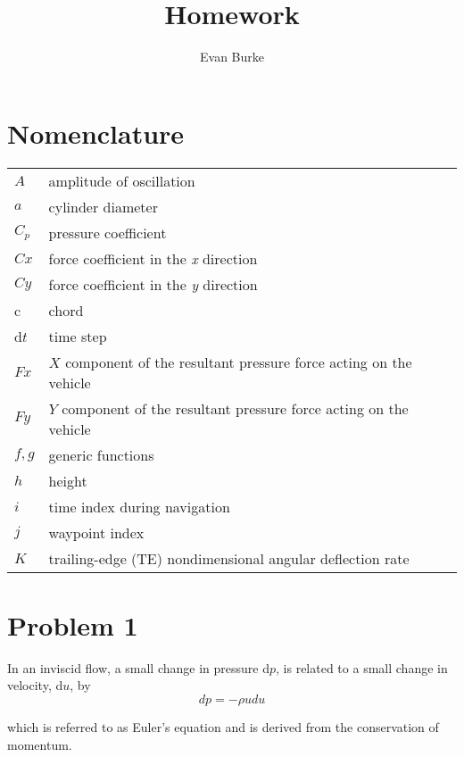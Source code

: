 \documentclass[12pt,letterpaper]{article}
\author{Evan Burke}
\title{Homework \homeworknumber}
\begin{document}
	
	
	\tableofcontents
	
	
	\newpage
	
	\section*{Nomenclature}
	
	{\renewcommand\arraystretch{1.0}
		\noindent\begin{longtable}{@{}l @{\quad=\quad} l@{}}
			$A$  & amplitude of oscillation \\
			$a$ &    cylinder diameter \\
			$C_p$& pressure coefficient \\
			$Cx$ & force coefficient in the \textit{x} direction \\
			$Cy$ & force coefficient in the \textit{y} direction \\
			c   & chord \\
			d$t$ & time step \\
			$Fx$ & $X$ component of the resultant pressure force acting on the vehicle \\
			$Fy$ & $Y$ component of the resultant pressure force acting on the vehicle \\
			$f, g$   & generic functions \\
			$h$  & height \\
			$i$  & time index during navigation \\
			$j$  & waypoint index \\
			$K$  & trailing-edge (TE) nondimensional angular deflection rate
	\end{longtable}}
	
	\newpage
	
	\section{Problem 1}
	In an inviscid flow, a small change in pressure d$p$, is related to a small change in velocity, d$u$, by 
	\begin{equation*}
		dp = - \rho udu    
	\end{equation*}
	
	which is referred to as Euler’s equation and is derived from the conservation of momentum.
\end{document}
